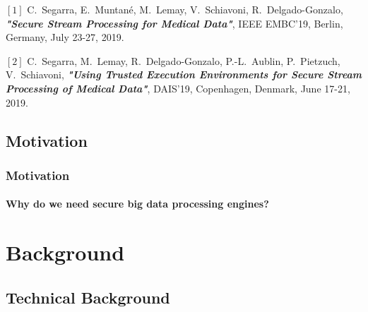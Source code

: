 \documentclass[10pt,    %
    english,            %
    xcolor=table,       %
    envcountsect,        %
    aspectratio=169     %
]{beamer}
\begin{document}
\begin{frame}
    \vspace{10pt}

    \tiny
    \begin{description}
        \item $[1]$ C.~Segarra, E.~Muntané, M.~Lemay, V.~Schiavoni, R.~Delgado-Gonzalo, \textit{\textbf{"Secure Stream Processing for Medical Data"}}, IEEE EMBC'19, Berlin, Germany, July 23-27, 2019.
        \item $[2]$ C.~Segarra, M.~Lemay, R.~Delgado-Gonzalo, P.-L.~Aublin, P.~Pietzuch, V.~Schiavoni, \textbf{\textit{"Using Trusted Execution Environments for Secure Stream Processing of Medical Data"}}, DAIS'19, Copenhagen, Denmark, June 17-21, 2019.
    \end{description}

\end{frame}

\subsection{Motivation}

\begin{frame}
    \frametitle{Motivation}
    \framesubtitle{Why do we need secure big data processing engines?}

    \vspace{-20pt}

    \begin{figure}[H]
        \centering
        \resizebox{0.9\linewidth}{!}{}
    \end{figure}

\end{frame}

\section{Background}
\label{sec:background}
\sectionframe

\subsection{Technical Background}
\end{document}
